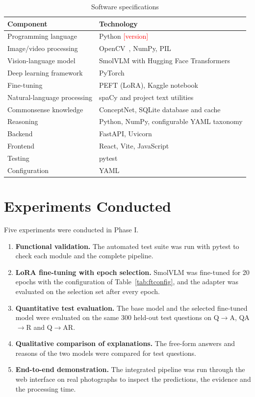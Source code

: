 \documentclass[12pt,a4paper,oneside]{report}
\newcommand{\fillin}[1]{\textcolor{red}{[#1]}}
\newcommand{\QtoA}{Q$\rightarrow$A}
\newcommand{\QAtoR}{QA$\rightarrow$R}
\newcommand{\QtoAR}{Q$\rightarrow$AR}
\begin{document}
\begin{table}[htbp]
\centering
\caption{Software specifications}
\label{tab:software}
\small
\begin{tabularx}{\textwidth}{@{}p{4.2cm}L@{}}
\toprule
\textbf{Component} & \textbf{Technology}\\
\midrule
Programming language & Python \fillin{version}\\
Image/video processing & OpenCV~\cite{bradski2000opencv}, NumPy, PIL\\
Vision-language model & SmolVLM with Hugging Face Transformers~\cite{wolf2020transformers}\\
Deep learning framework & PyTorch~\cite{paszke2019pytorch}\\
Fine-tuning & PEFT (LoRA), Kaggle notebook\\
Natural-language processing & spaCy and project text utilities\\
Commonsense knowledge & ConceptNet, SQLite database and cache\\
Reasoning & Python, NumPy, configurable YAML taxonomy\\
Backend & FastAPI, Uvicorn\\
Frontend & React, Vite, JavaScript\\
Testing & pytest\\
Configuration & YAML\\
\bottomrule
\end{tabularx}
\end{table}

\section{Experiments Conducted}

Five experiments were conducted in Phase I.

\begin{enumerate}[label=\textbf{E\arabic*.},leftmargin=*]
\item \textbf{Functional validation.} The automated test suite was run with
  pytest to check each module and the complete pipeline.
\item \textbf{LoRA fine-tuning with epoch selection.} SmolVLM was fine-tuned
  for 20 epochs with the configuration of Table~\ref{tab:ftconfig}, and the
  adapter was evaluated on the selection set after every epoch.
\item \textbf{Quantitative test evaluation.} The base model and the selected
  fine-tuned model were evaluated on the same 300 held-out test questions on
  \QtoA, \QAtoR{} and \QtoAR.
\item \textbf{Qualitative comparison of explanations.} The free-form answers
  and reasons of the two models were compared for test questions.
\item \textbf{End-to-end demonstration.} The integrated pipeline was run through
  the web interface on real photographs to inspect the predictions, the evidence
  and the processing time.
\end{enumerate}
\end{document}
